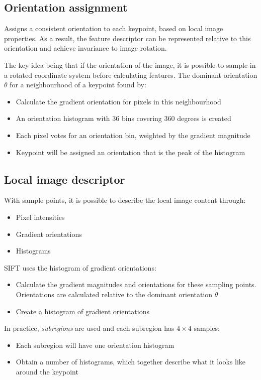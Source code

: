 \documentclass{report}
\begin{document}
\subsection{Orientation assignment}

Assigns a consistent orientation to each keypoint, based on local image
properties. As a result, the feature descriptor can be represented relative to
this orientation and achieve invariance to image rotation.

The key idea being that if the orientation of the image, it is possible to
sample in a rotated coordinate system before calculating features. The dominant
orientation $\theta$ for a neighbourhood of a keypoint found by:
\begin{itemize}
    \item Calculate the gradient orientation for pixels in this
    neighbourhood 
    \item An orientation histogram with 36 bins covering 360 degrees is
    created 
    \item Each pixel votes for an orientation bin, weighted by the gradient
    magnitude 
    \item Keypoint will be assigned an orientation that is the peak of the
    histogram 
\end{itemize}

\subsection*{Local image descriptor}

With sample points, it is possible to describe the local image content through:
\begin{itemize}
    \item Pixel intensities 
    \item Gradient orientations 
    \item Histograms 
\end{itemize}

SIFT uses the histogram of gradient orientations:
\begin{itemize}
    \item Calculate the gradient magnitudes and orientations for these sampling
    points. Orientations are calculated relative to the dominant orientation $\theta$
    \item Create a histogram of gradient orientations
\end{itemize}

In practice, \textit{subregions} are used and each subregion has $4 \times 4$ samples:
\begin{itemize}
    \item Each subregion will have one orientation histogram
    \item Obtain a number of histograms, which together describe what it looks
    like around the keypoint
\end{itemize}
\end{document}
